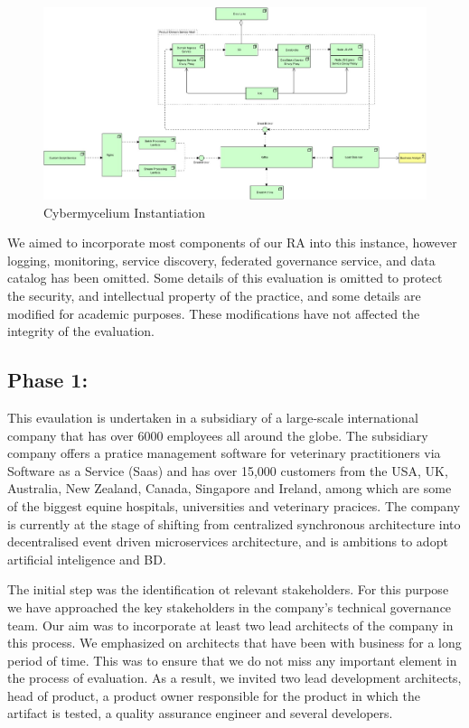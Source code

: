 \documentclass[review]{elsarticle}
\begin{document}
\begin{figure}
    \includegraphics[width=23cm]{Media/concrete-mycelium.jpg}
    \caption{Cybermycelium Instantiation}
    \label{fig:ConcreteCyberMycelium}
\end{figure}

We aimed to incorporate most components of our RA into this instance, however logging, monitoring, service discovery, federated governance service, and data catalog has been omitted. Some details of this evaluation is omitted to protect the security, and intellectual property of the practice, and some details are modified for academic purposes. These modifications have not affected the integrity of the evaluation.  

\subsection{Phase 1:}

This evaulation is undertaken in a subsidiary of a large-scale international company that has over 6000 employees all around the globe. The subsidiary company offers a pratice management software for veterinary practitioners via Software as a Service (Saas) and has over 15,000 customers from the USA, UK, Australia, New Zealand, Canada, Singapore and Ireland, among which are some of the biggest equine hospitals, universities and veterinary pracices. The company is currently at the stage of shifting from centralized synchronous architecture into decentralised event driven microservices architecture, and is ambitions to adopt artificial inteligence and BD.

The initial step was the identification ot relevant stakeholders. For this purpose we have approached the key stakeholders in the company's technical governance team. Our aim was to incorporate at least two lead architects of the company in this process. We emphasized on architects that have been with business for a long period of time. This was to ensure that we do not miss any important element in the process of evaluation. As a result, we invited two lead development architects, head of product, a product owner responsible for the product in which the artifact is tested, a quality assurance engineer and several developers. 
\end{document}
